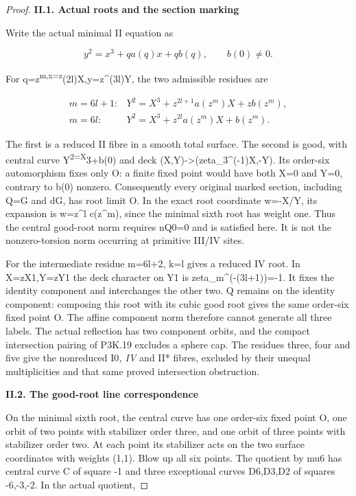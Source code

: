\begin{proof}
\par

\medskip\noindent\textbf{II.1. Actual roots and the section marking}

Write the actual minimal II equation as

\[
y^2=x^3+q a(q)x+q b(q),\qquad b(0)\ne0.
\]

For q=z\textsuperscript{m,x=z}(2l)X,y=z\^{}(3l)Y, the two admissible residues are

\[
\begin{array}{ll}m=6l+1:&Y^2=X^3+z^{2l+1}a(z^m)X+z b(z^m),\\m=6l:&Y^2=X^3+z^{2l}a(z^m)X+b(z^m).\end{array}
\]

The first is a reduced II fibre in a smooth total surface. The
second is good, with central curve Y\textsuperscript{2=X}3+b(0) and deck
(X,Y)-\textgreater(zeta\_3\^{}(-1)X,-Y). Its order-six automorphism fixes only O:
a finite fixed point would have both X=0 and Y=0, contrary to
b(0) nonzero. Consequently every original marked section,
including Q=G and dG, has root limit O. In the exact root
coordinate w=-X/Y, its expansion is w=z\^{}l c(z\^{}m), since the
minimal sixth root has weight one. Thus the central good-root
norm requires nQ0=0 and is satisfied here. It is not the
nonzero-torsion norm occurring at primitive III/IV sites.

For the intermediate residue m=6l+2, k=l gives a reduced IV
root. In X=zX1,Y=zY1 the deck character on Y1 is
zeta\_m\^{}(-(3l+1))=-1. It fixes the identity component and
interchanges the other two. Q remains on the identity
component: composing this root with its cubic good root gives
the same order-six fixed point O. The affine component norm
therefore cannot generate all three labels. The actual
reflection has two component orbits, and the compact
intersection pairing of P3K.19 excludes a sphere cap.
The residues three, four and five give the nonreduced I0\emph{,
IV} and II* fibres, excluded by their unequal multiplicities
and that same proved intersection obstruction.

\par

\medskip\noindent\textbf{II.2. The good-root line correspondence}

On the minimal sixth root, the central curve has one order-six
fixed point O, one orbit of two points with stabilizer order
three, and one orbit of three points with stabilizer order two.
At each point its stabilizer acts on the two surface coordinates
with weights (1,1). Blow up all six points. The quotient by
mu6 has central curve C of square -1 and three exceptional
curves D6,D3,D2 of squares -6,-3,-2. In the actual quotient,


\end{proof}

